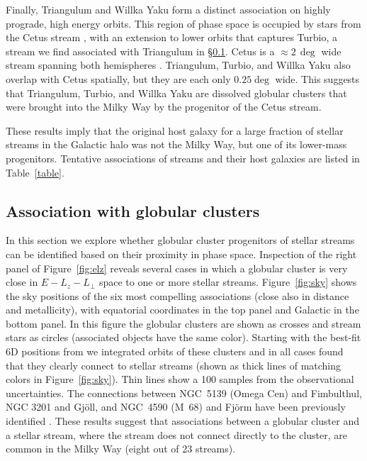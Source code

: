 \documentclass[twocolumn]{aastex63}
\begin{document}
Finally, Triangulum and Willka Yaku form a distinct association on highly prograde, high energy orbits.
This region of phase space is occupied by stars from the Cetus stream \citep{yuan2019}, with an extension to lower orbits that captures Turbio, a stream we find associated with Triangulum in \S\ref{sec:progenitors}.
Cetus is a $\approx2\,\deg$ wide stream spanning both hemispheres \citep[the southern portion of the stream was identified as the Palca overdensity]{newberg2009, chang2020}.
Triangulum, Turbio, and Willka Yaku also overlap with Cetus spatially, but they are each only $0.25\deg$ wide.
This suggests that Triangulum, Turbio, and Willka Yaku are dissolved globular clusters that were brought into the Milky Way by the progenitor of the Cetus stream.

These results imply that the original host galaxy for a large fraction of stellar streams in the Galactic halo was not the Milky Way, but one of its lower-mass progenitors.
Tentative associations of streams and their host galaxies are listed in Table~\ref{table}.


\subsection{Association with globular clusters}
\label{sec:progenitors}
In this section we explore whether globular cluster progenitors of stellar streams can be identified based on their proximity in phase space.
Inspection of the right panel of Figure~\ref{fig:elz} reveals several cases in which a globular cluster is very close in $E-L_z-L_\perp$ space to one or more stellar streams.
Figure~\ref{fig:sky} shows the sky positions of the six most compelling associations (close also in distance and metallicity), with equatorial coordinates in the top panel and Galactic in the bottom panel.
In this figure the globular clusters are shown as crosses and stream stars as circles (associated objects have the same color).
Starting with the best-fit 6D positions from \citet{baumgardt2019} we integrated orbits of these clusters and in all cases found that they clearly connect to stellar streams (shown as thick lines of matching colors in Figure~\ref{fig:sky}).
Thin lines show a 100 samples from the observational uncertainties.
The connections between NGC~5139 (Omega Cen) and Fimbulthul, NGC 3201 and Gj\" oll, and NGC~4590 (M~68) and Fj\" orm have been previously identified \citep[and references therein]{ibata2021}.
These results suggest that associations between a globular cluster and a stellar stream, where the stream does not connect directly to the cluster, are common in the Milky Way (eight out of 23 streams).
\end{document}
